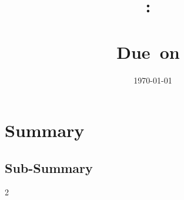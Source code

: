 \documentclass{article}
\title{
    \vspace{2in}
    \textmd{\textbf{\hmwkClass:\ \\ \hmwkTitle}}\\
    \normalsize\vspace{0.1in}\small{Due\ on\ \hmwkDueDate}\\
    \vspace{0.1in}\Large{\textit{\paprTitle}}
    \vspace{3in}
}
\author{\hmwkAuthorName}
\date{\today}
\begin{document}
\maketitle

\pagebreak

\section{Summary}


\lipsum[4]

\subsection{Sub-Summary}

\lipsum[2-3]

\begin{multicols}{2}

\lipsum[1]

\end{multicols}

\lipsum[2-3]

\end{document}
